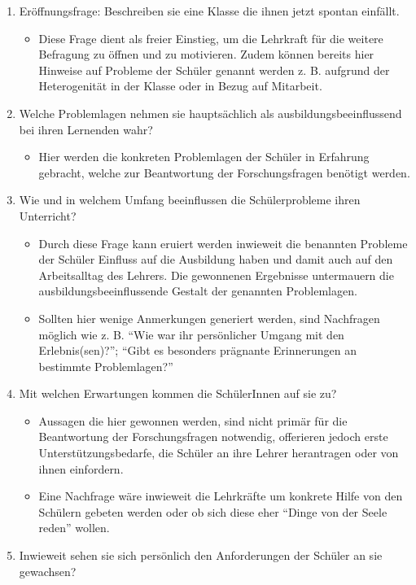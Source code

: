 \begin{enumerate}
	\item Eröffnungsfrage: Beschreiben sie eine Klasse die ihnen jetzt spontan einfällt.
	\begin{itemize}
		\item Diese Frage dient als freier Einstieg, um die Lehrkraft für die weitere Befragung zu öffnen und zu motivieren. Zudem können bereits hier Hinweise auf Probleme der Schüler genannt werden z. B. aufgrund der Heterogenität in der Klasse oder in Bezug auf Mitarbeit.
	\end{itemize}
	\item Welche Problemlagen nehmen sie hauptsächlich als ausbildungsbeeinflussend bei ihren Lernenden wahr?
	\begin{itemize}
		\item Hier werden die konkreten Problemlagen der Schüler in Erfahrung gebracht, welche zur Beantwortung der Forschungsfragen benötigt werden.
	\end{itemize}
	\item Wie und in welchem Umfang beeinflussen die Schülerprobleme ihren Unterricht?
	\begin{itemize}
		\item Durch diese Frage kann eruiert werden inwieweit die benannten Probleme der Schüler Einfluss auf die Ausbildung haben und damit auch auf den Arbeitsalltag des Lehrers. Die gewonnenen Ergebnisse untermauern die ausbildungsbeeinflussende Gestalt der genannten Problemlagen.
		\item Sollten hier wenige Anmerkungen generiert werden, sind Nachfragen möglich wie z. B. "`Wie war ihr persönlicher Umgang mit den Erlebnis(sen)?"'; "`Gibt es besonders prägnante Erinnerungen an bestimmte Problemlagen?"'
	\end{itemize}
	\item Mit welchen Erwartungen kommen die SchülerInnen auf sie zu?
	\begin{itemize}
		\item Aussagen die hier gewonnen werden, sind nicht primär für die Beantwortung der Forschungsfragen notwendig, offerieren jedoch erste Unterstützungsbedarfe, die Schüler an ihre Lehrer herantragen oder von ihnen einfordern.
		\item Eine Nachfrage wäre inwieweit die Lehrkräfte um konkrete Hilfe von den Schülern gebeten werden oder ob sich diese eher "`Dinge von der Seele reden"' wollen.
	\end{itemize}
	\item Inwieweit sehen sie sich persönlich den Anforderungen der Schüler an sie gewachsen? 

\end{enumerate}
